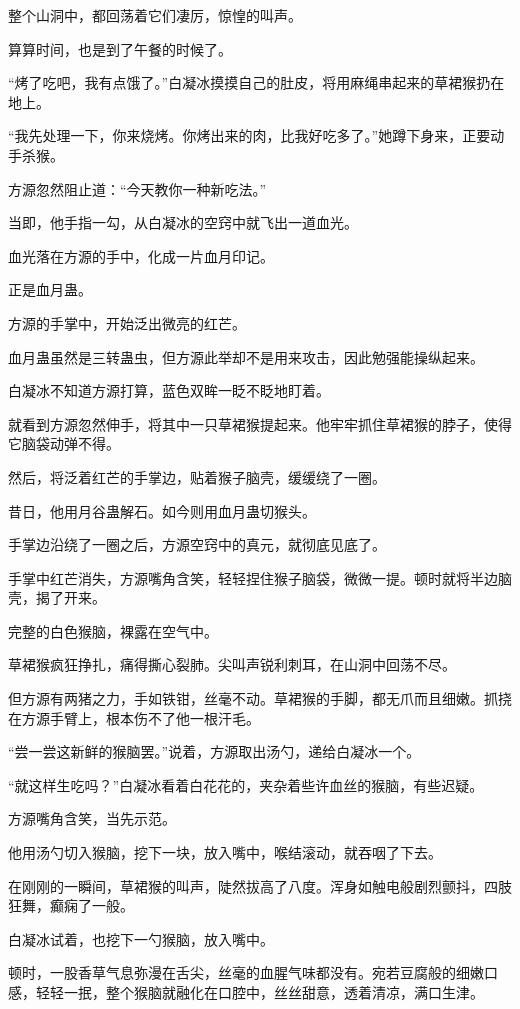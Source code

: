 \begin{this_body}
整个山洞中，都回荡着它们凄厉，惊惶的叫声。

算算时间，也是到了午餐的时候了。

“烤了吃吧，我有点饿了。”白凝冰摸摸自己的肚皮，将用麻绳串起来的草裙猴扔在地上。

“我先处理一下，你来烧烤。你烤出来的肉，比我好吃多了。”她蹲下身来，正要动手杀猴。

方源忽然阻止道：“今天教你一种新吃法。”

当即，他手指一勾，从白凝冰的空窍中就飞出一道血光。

血光落在方源的手中，化成一片血月印记。

正是血月蛊。

方源的手掌中，开始泛出微亮的红芒。

血月蛊虽然是三转蛊虫，但方源此举却不是用来攻击，因此勉强能操纵起来。

白凝冰不知道方源打算，蓝色双眸一眨不眨地盯着。

就看到方源忽然伸手，将其中一只草裙猴提起来。他牢牢抓住草裙猴的脖子，使得它脑袋动弹不得。

然后，将泛着红芒的手掌边，贴着猴子脑壳，缓缓绕了一圈。

昔日，他用月谷蛊解石。如今则用血月蛊切猴头。

手掌边沿绕了一圈之后，方源空窍中的真元，就彻底见底了。

手掌中红芒消失，方源嘴角含笑，轻轻捏住猴子脑袋，微微一提。顿时就将半边脑壳，揭了开来。

完整的白色猴脑，裸露在空气中。

草裙猴疯狂挣扎，痛得撕心裂肺。尖叫声锐利刺耳，在山洞中回荡不尽。

但方源有两猪之力，手如铁钳，丝毫不动。草裙猴的手脚，都无爪而且细嫩。抓挠在方源手臂上，根本伤不了他一根汗毛。

“尝一尝这新鲜的猴脑罢。”说着，方源取出汤勺，递给白凝冰一个。

“就这样生吃吗？”白凝冰看着白花花的，夹杂着些许血丝的猴脑，有些迟疑。

方源嘴角含笑，当先示范。

他用汤勺切入猴脑，挖下一块，放入嘴中，喉结滚动，就吞咽了下去。

在刚刚的一瞬间，草裙猴的叫声，陡然拔高了八度。浑身如触电般剧烈颤抖，四肢狂舞，癫痫了一般。

白凝冰试着，也挖下一勺猴脑，放入嘴中。

顿时，一股香草气息弥漫在舌尖，丝毫的血腥气味都没有。宛若豆腐般的细嫩口感，轻轻一抿，整个猴脑就融化在口腔中，丝丝甜意，透着清凉，满口生津。


\end{this_body}
